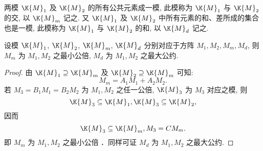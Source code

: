 \documentclass[lang=cn]{ztex}
\begin{document}
两模 $\K{M}_1$ 及 $\K{M}_2$ 的所有公共元素成一模, 此模称为 $\K{M}_1$ 与 $\K{M}_2$ 的交, 以 $\K{M}_m$ 记之.
又 $\K{M}_1$ 及 $\K{M}_2$ 中所有元素的和、差所成的集合也是一模, 此模称为 $\K{M}_1$ 与 $\K{M}_2$ 的和, 
以 $\K{M}_d$ 记之.

\begin{theorem}
  设模 $\K{M}_1$, $\K{M}_2$, $\K{M}_m$, $\K{M}_d$ 分别对应于方阵 $M_1, M_2, M_m, M_d$, 则 $M_m$ 为 
  $M_1, M_2$ 之最小公倍, $M_d$ 为 $M_1, M_2$ 之最大公约.
\end{theorem}
\begin{proof}
  由 $\K{M}_1 \supseteq \K{M}_m$ 及 $\K{M}_2 \supseteq \K{M}_m$ 可知:
  \[
    M_m = A_1M_1 + A_2M_2.
  \]
  若 $M_3 = B_1M_1 = B_2M_2$ 为 $M_1, M_2$ 之任一公倍, $\K{M}_3$ 为 $M_3$ 对应之模, 则
  \[
    \K{M}_3 \subseteq \K{M}_1, \K{M}_3 \subseteq \K{M}_2,
  \] 
  因而
  \[
    \K{M}_3 \subseteq \K{M}_m,  M_3 = CM_m.
  \]
  即 $M_m$ 为 $M_1, M_2$ 之最小公倍 ．同样可证 $M_d$ 为 $M_1, M_2$ 之最大公约.
\end{proof}
\zaliasOff
\end{document}
